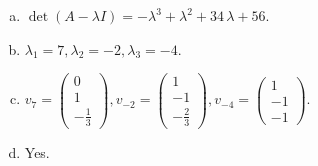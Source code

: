 \begin{questions}
\begin{solution}
\begin{enumerate}[(a)]
\item $\det(A-\lambda I)=-{\lambda}^{3} + {\lambda}^{2} + 34 \, {\lambda} + 56$.
\item ${\lambda}_1=7, {\lambda}_2=-2, {\lambda}_3=-4$.
\item $v_{7}=\left(\begin{array}{r}
0 \\
1 \\
-\frac{1}{3}
\end{array}\right), v_{-2}=\left(\begin{array}{r}
1 \\
-1 \\
-\frac{2}{3}
\end{array}\right), v_{-4}=\left(\begin{array}{r}
1 \\
-1 \\
-1
\end{array}\right)$.
\item Yes.
\end{enumerate}
\end{solution}

\end{questions}

\newpage


\begin{center}
\end{center}

